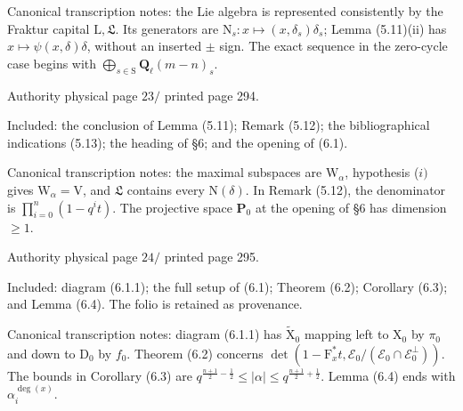 \documentclass[10pt,leqno]{article}
\begin{document}
\noindent Canonical transcription notes: the Lie algebra is represented consistently by the Fraktur capital \(\mathrm{L}, \mathfrak{L} \). Its generators are \(\mathrm{N}_{s}:x\longmapsto (x,\delta _{s})\delta _{s}\); Lemma (5.11)(ii) has \(x\longmapsto \psi (x,\delta )\delta \), without an inserted \(\pm \) sign. The exact sequence in the zero-cycle case begins with \(\bigoplus\limits_{s\in \mathrm{S}}\mathbf{Q}_{\ell }(m- n)_{s}\).\par

\clearpage

\label{physical-23}\par\smallskip

\noindent Authority physical page \(23 /\) printed page 294.\par

\noindent Included: the conclusion of Lemma (5.11); Remark (5.12); the bibliographical indications (5.13); the heading of §6; and the opening of (6.1).\par

\noindent Canonical transcription notes: the maximal subspaces are \(\mathrm{W}_{\alpha }\), hypothesis (\(i)\) gives \(\mathrm{W}_{\alpha }=\mathrm{V}\), and \(\mathfrak{L} \) contains every \(\mathrm{N}(\delta )\). In Remark (5.12), the denominator is \(\prod _{i=0}^{n}(1- q^{i} t)\). The projective space \(\mathbf{P}_{0}\) at the opening of §6 has dimension \(\geq 1\).\par

\clearpage

\label{physical-24}\par\smallskip

\noindent Authority physical page \(24 /\) printed page 295.\par

\noindent Included: diagram (6.1.1); the full setup of (6.1); Theorem (6.2); Corollary (6.3); and Lemma (6.4). The folio is retained as provenance.\par

\noindent Canonical transcription notes: diagram (6.1.1) has \(\widetilde{\mathrm{X}}_{0}\) mapping left to \(\mathrm{X}_{0}\) by \(\pi _{0}\) and down to \(\mathrm{D}_{0}\) by \(f_{0}\). Theorem (6.2) concerns \(\operatorname{det}(1- \mathrm{F}_{x}^{*}t,\mathcal{E} _{0}/(\mathcal{E} _{0}\cap \mathcal{E} _{0}^{\perp }))\). The bounds in Corollary (6.3) are \(q^{\frac{n+1}{2}- \frac{1}{2}}\leq |\alpha |\leq q^{\frac{n+1}{2}+\frac{1}{2}}\). Lemma (6.4) ends with \(\alpha _{i}^{\operatorname{deg}(x)}\).\par
\end{document}
